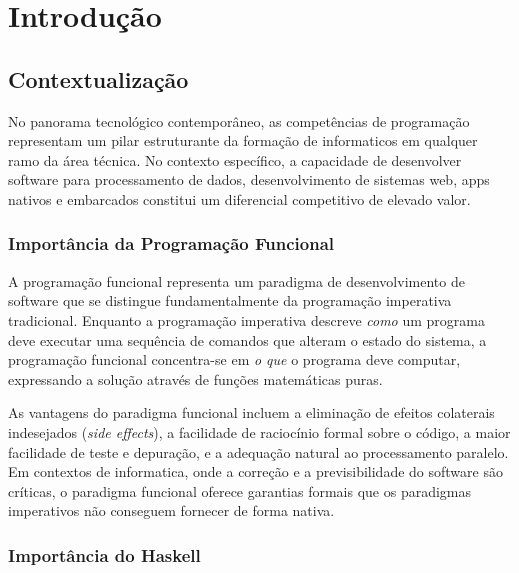 \documentclass[12pt, a4paper, oneside]{report}
\begin{document}
\listoffigures
\clearpage

\listoftables
\clearpage

\lstlistoflistings
\clearpage

\chapter{Introdução}

\section{Contextualização}

No panorama tecnológico contemporâneo, as competências de programação representam um pilar estruturante da formação de informaticos em qualquer ramo da área técnica. No contexto específico, a capacidade de desenvolver software para processamento de dados, desenvolvimento de sistemas web, apps nativos e embarcados constitui um diferencial competitivo de elevado valor.

\subsection{Importância da Programação Funcional}

A programação funcional representa um paradigma de desenvolvimento de software que se distingue fundamentalmente da programação imperativa tradicional. Enquanto a programação imperativa descreve \textit{como} um programa deve executar uma sequência de comandos que alteram o estado do sistema, a programação funcional concentra-se em \textit{o que} o programa deve computar, expressando a solução através de funções matemáticas puras.

As vantagens do paradigma funcional incluem a eliminação de efeitos colaterais indesejados (\textit{side effects}), a facilidade de raciocínio formal sobre o código, a maior facilidade de teste e depuração, e a adequação natural ao processamento paralelo. Em contextos de informatica, onde a correção e a previsibilidade do software são críticas, o paradigma funcional oferece garantias formais que os paradigmas imperativos não conseguem fornecer de forma nativa.

\subsection{Importância do Haskell}
\end{document}
